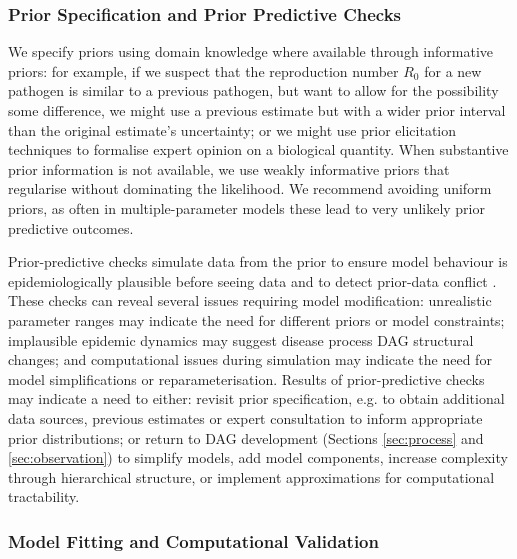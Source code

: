 \documentclass{article}
\begin{document}
\subsubsection{Prior Specification and Prior Predictive Checks}

We specify priors using domain knowledge where available through informative priors: for example, if we suspect that the reproduction number $R_0$ for a new pathogen is similar to a previous pathogen, but want to allow for the possibility some difference, we might use a previous estimate but with a wider prior interval than the original estimate's uncertainty; or we might use prior elicitation techniques \citep{o2006uncertain} to formalise expert opinion on a biological quantity. When substantive prior information is not available, we use weakly informative priors that regularise without dominating the likelihood. We recommend avoiding uniform priors, as often in multiple-parameter models these lead to very unlikely prior predictive outcomes.

Prior-predictive checks simulate data from the prior to ensure model behaviour is epidemiologically plausible before seeing data and to detect prior-data conflict \citep{Box1980,yang2025detecting}.
These checks can reveal several issues requiring model modification: unrealistic parameter ranges may indicate the need for different priors or model constraints; implausible epidemic dynamics may suggest disease process \ac{DAG} structural changes; and computational issues during simulation may indicate the need for model simplifications or reparameterisation.
Results of prior-predictive checks may indicate a need to either: revisit prior specification, e.g. to obtain additional data sources, previous estimates or expert consultation to inform appropriate prior distributions; or return to \ac{DAG} development (Sections \ref{sec:process} and \ref{sec:observation}) to simplify models, add model components, increase complexity through hierarchical structure, or implement approximations for computational tractability.

\subsubsection{Model Fitting and Computational Validation}
\end{document}
